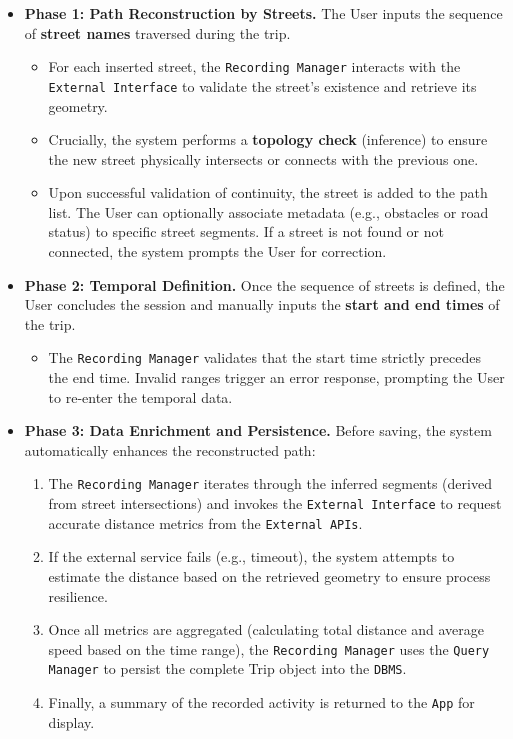 \begin{itemize}
    \item \textbf{Phase 1: Path Reconstruction by Streets.} The User inputs the sequence of \textbf{street names} traversed during the trip.
    \begin{itemize}
        \item For each inserted street, the \texttt{Recording Manager} interacts with the \texttt{External Interface} to validate the street's existence and retrieve its geometry.
        \item Crucially, the system performs a \textbf{topology check} (inference) to ensure the new street physically intersects or connects with the previous one. 
        \item Upon successful validation of continuity, the street is added to the path list. The User can optionally associate metadata (e.g., obstacles or road status) to specific street segments. If a street is not found or not connected, the system prompts the User for correction.
    \end{itemize}

    \item \textbf{Phase 2: Temporal Definition.} Once the sequence of streets is defined, the User concludes the session and manually inputs the \textbf{start and end times} of the trip.
    \begin{itemize}
        \item The \texttt{Recording Manager} validates that the start time strictly precedes the end time. Invalid ranges trigger an error response, prompting the User to re-enter the temporal data.
    \end{itemize}

    \item \textbf{Phase 3: Data Enrichment and Persistence.} Before saving, the system automatically enhances the reconstructed path:
    \begin{enumerate}
        \item The \texttt{Recording Manager} iterates through the inferred segments (derived from street intersections) and invokes the \texttt{External Interface} to request accurate distance metrics from the \texttt{External APIs}.
        \item If the external service fails (e.g., timeout), the system attempts to estimate the distance based on the retrieved geometry to ensure process resilience.
        \item Once all metrics are aggregated (calculating total distance and average speed based on the time range), the \texttt{Recording Manager} uses the \texttt{Query Manager} to persist the complete Trip object into the \texttt{DBMS}.
        \item Finally, a summary of the recorded activity is returned to the \texttt{App} for display.
    \end{enumerate}
\end{itemize}



